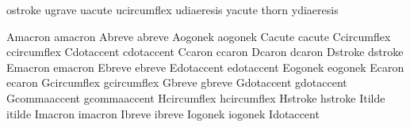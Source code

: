  ostroke       {}
 ugrave        {}
 uacute        {}
 ucircumflex   {}
 udiaeresis    {}
 yacute        {}
 thorn         {}
 ydiaeresis    {}

 Amacron       {}
 amacron       {}
 Abreve        {}
 abreve        {}
 Aogonek       {}
 aogonek       {}
 Cacute        {}
 cacute        {}
 Ccircumflex   {}
 ccircumflex   {}
 Cdotaccent    {}
 cdotaccent    {}
 Ccaron        {}
 ccaron        {}
 Dcaron        {}
 dcaron        {}
 Dstroke       {}
 dstroke       {}
 Emacron       {}
 emacron       {}
 Ebreve        {}
 ebreve        {}
 Edotaccent    {}
 edotaccent    {}
 Eogonek       {}
 eogonek       {}
 Ecaron        {}
 ecaron        {}
 Gcircumflex   {}
 gcircumflex   {}
 Gbreve        {}
 gbreve        {}
 Gdotaccent    {}
 gdotaccent    {}
 Gcommaaccent  {}
 gcommaaccent  {}
 Hcircumflex   {}
 hcircumflex   {}
 Hstroke       {}
 hstroke       {}
 Itilde        {}
 itilde        {}
 Imacron       {}
 imacron       {}
 Ibreve        {}
 ibreve        {}
 Iogonek       {}
 iogonek       {}
 Idotaccent    {}

